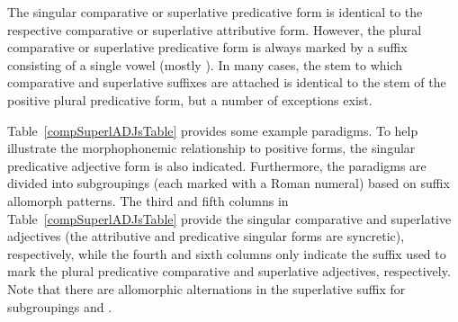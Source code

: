 The singular comparative or superlative predicative form is identical %
to the respective comparative or superlative attributive form. However, the plural comparative or superlative predicative form is always marked by a suffix consisting of a single vowel (mostly ). In many cases, the stem to which comparative and superlative suffixes are attached is identical %
to the stem of the positive plural predicative form, but a number of exceptions exist. 

Table~\vref{compSuperlADJsTable} provides some example paradigms. 
To help illustrate the morphophonemic relationship to positive forms, the singular predicative adjective form is also indicated. %
Furthermore, the paradigms are divided into subgroupings (each marked with a Roman numeral) based on suffix allomorph patterns. The third and fifth columns in Table~\ref{compSuperlADJsTable} provide the singular comparative and superlative adjectives (the attributive and predicative singular forms are syncretic), respectively, while the fourth and sixth columns only indicate the suffix used to mark the plural predicative comparative and superlative adjectives, respectively. Note that there are allomorphic alternations in the superlative suffix for subgroupings  and . %

